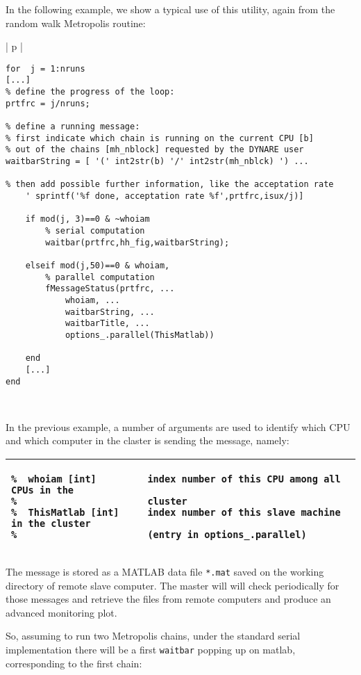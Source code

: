 \documentclass[12pt,a4paper,pdftex]{article}
\begin{document}
In the following example, we show a typical use of this utility, again from the random walk Metropolis routine:
\singlespacing
{\footnotesize
\noindent\begin{tabular}[b]{| p{\linewidth} |}
\hline
\begin{verbatim}
for  j = 1:nruns
[...]
% define the progress of the loop:
prtfrc = j/nruns;

% define a running message:
% first indicate which chain is running on the current CPU [b]
% out of the chains [mh_nblock] requested by the DYNARE user
waitbarString = [ '(' int2str(b) '/' int2str(mh_nblck) ') ...

% then add possible further information, like the acceptation rate
    ' sprintf('%f done, acceptation rate %f',prtfrc,isux/j)]

    if mod(j, 3)==0 & ~whoiam
        % serial computation
        waitbar(prtfrc,hh_fig,waitbarString);

    elseif mod(j,50)==0 & whoiam,
        % parallel computation
        fMessageStatus(prtfrc, ...
            whoiam, ...
            waitbarString, ...
            waitbarTitle, ...
            options_.parallel(ThisMatlab))

    end
    [...]
end
\end{verbatim}
\\ \hline
\end{tabular}
}
\doublespacing
In the previous example, a number of arguments are used to identify which CPU and which computer in the claster is sending the message, namely:
\singlespacing
{\footnotesize
\noindent\begin{tabular}[b]{| p{\linewidth} |}
\hline
\begin{verbatim}
%  whoiam [int]         index number of this CPU among all CPUs in the
%                       cluster
%  ThisMatlab [int]     index number of this slave machine in the cluster
%                       (entry in options_.parallel)
\end{verbatim}
\\ \hline
\end{tabular}
}
\doublespacing
The message is stored as a MATLAB data file \verb"*.mat" saved on the working directory of remote slave computer. The master will will check periodically for those messages and retrieve the files from remote computers and produce an advanced monitoring plot.

So, assuming to run two Metropolis chains, under the standard serial implementation there will be a first \verb"waitbar" popping up on matlab, corresponding to the first chain:
\end{document}
